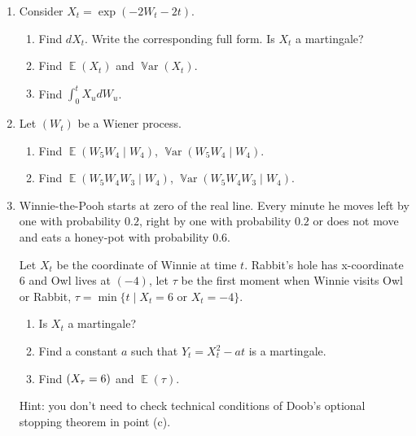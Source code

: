 \documentclass[12pt]{article}
\let\P\relax
\DeclareMathOperator{\P}{\mathbb{P}}
\DeclareMathOperator{\E}{\mathbb{E}}
\DeclareMathOperator{\Var}{\mathbb{V}ar}
\begin{document}
\begin{enumerate}



\item Consider $X_t = \exp(-2W_t - 2t)$.
\begin{enumerate}
    \item Find $dX_t$. Write the corresponding full form. Is $X_t$ a martingale?
    \item Find $\E(X_t)$ and $\Var(X_t)$.
    \item Find $\int_0^t X_u dW_u$.
\end{enumerate}


\item Let $(W_t)$ be a Wiener process.
\begin{enumerate}
    \item Find $\E(W_5 W_4 \mid W_4)$, $\Var(W_5 W_4 \mid W_4)$.
    \item Find $\E(W_5 W_4 W_3 \mid W_4)$, $\Var(W_5 W_4 W_3 \mid W_4)$.
\end{enumerate}

\item Winnie-the-Pooh starts at zero of the real line. 
Every minute he moves left by one with probability $0.2$, right by one with probability $0.2$ 
or does not move and eats a honey-pot with probability $0.6$. 


Let $X_t$ be the coordinate of Winnie at time $t$. Rabbit's hole has x-coordinate $6$ and Owl lives at $(-4)$,
let $\tau$ be the first moment when Winnie visits Owl or Rabbit, $\tau = \min\{t \mid X_t = 6 \text{ or } X_t = -4\}$.

\begin{enumerate}
    \item Is $X_t$ a martingale?
    \item Find a constant $a$ such that $Y_t = X_t^2 - at$ is a martingale. 
    \item Find $\P(X_{\tau} = 6)$ and $\E(\tau)$.
\end{enumerate}

Hint: you don't need to check technical conditions of Doob's optional stopping theorem in point (c). 


\end{enumerate}
\end{document}
